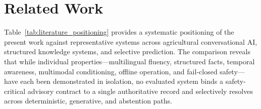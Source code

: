\documentclass[a4paper,fleqn]{cas-dc}
\begin{document}
\section{Related Work}
\label{sec:related_work}

Table~\ref{tab:literature_positioning} provides a systematic positioning of the present work against representative systems across agricultural conversational AI, structured knowledge systems, and selective prediction. The comparison reveals that while individual properties---multilingual fluency, structured facts, temporal awareness, multimodal conditioning, offline operation, and fail-closed safety---have each been demonstrated in isolation, no evaluated system binds a safety-critical advisory contract to a single authoritative record and selectively resolves across deterministic, generative, and abstention paths.


\begin{table}[pos=t]
\centering
\caption{Systematic positioning of KrishokChat alongside contemporary agricultural AI, retrieval-augmented decision support, and low-resource advisory systems.}
\label{tab:literature_positioning}
\small
{}
\end{table}
\end{document}
